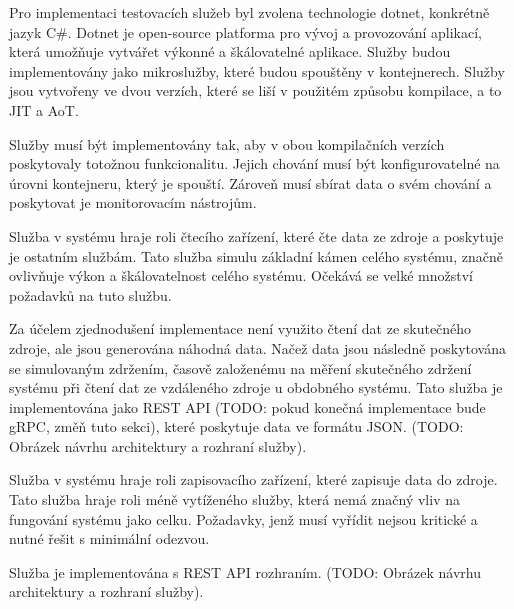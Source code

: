 
Pro implementaci testovacích služeb byl zvolena technologie dotnet, konkrétně jazyk C\#. Dotnet je open-source platforma pro vývoj a provozování aplikací, která umožňuje vytvářet výkonné a škálovatelné aplikace. Služby budou implementovány jako mikroslužby, které budou spouštěny v kontejnerech. Služby jsou vytvořeny ve dvou verzích, které se liší v použitém způsobu kompilace, a to JIT a AoT.



Služby musí být implementovány tak, aby v obou kompilačních verzích poskytovaly totožnou funkcionalitu. Jejich chování musí být konfigurovatelné na úrovni kontejneru, který je spouští. Zároveň musí sbírat data o svém chování a poskytovat je monitorovacím nástrojům.



Služba v systému hraje roli čtecího zařízení, které čte data ze zdroje a poskytuje je ostatním službám. Tato služba simulu základní kámen celého systému, značně ovlivňuje výkon a škálovatelnost celého systému. Očekává se velké množství požadavků na tuto službu.

Za účelem zjednodušení implementace není využito čtení dat ze skutečného zdroje, ale jsou generována náhodná data. Načež data jsou následně poskytována se simulovaným zdržením, časově založenému na měření skutečného zdržení systému při čtení dat ze vzdáleného zdroje u obdobného systému. Tato služba je implementována jako REST API (TODO: pokud konečná implementace bude gRPC, změň tuto sekci), které poskytuje data ve formátu JSON. (TODO: Obrázek návrhu architektury a rozhraní služby).


Služba v systému hraje roli zapisovacího zařízení, které zapisuje data do zdroje. Tato služba hraje roli méně vytíženého služby, která nemá značný vliv na fungování systému jako celku. Požadavky, jenž musí vyřídit nejsou kritické a nutné řešit s minimální odezvou.

Služba je implementována s REST API rozhraním. (TODO: Obrázek návrhu architektury a rozhraní služby).



